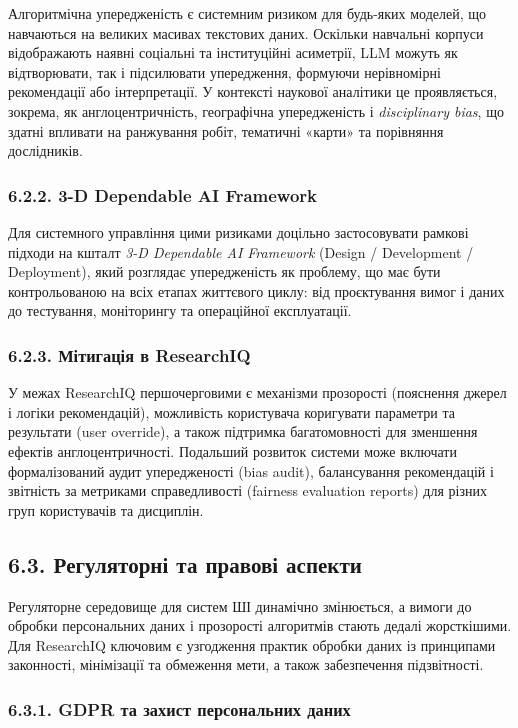 Алгоритмічна упередженість є системним ризиком для будь-яких моделей, що навчаються на великих масивах текстових даних. Оскільки навчальні корпуси відображають наявні соціальні та інституційні асиметрії, LLM можуть як відтворювати, так і підсилювати упередження, формуючи нерівномірні рекомендації або інтерпретації. У контексті наукової аналітики це проявляється, зокрема, як англоцентричність, географічна упередженість і \emph{disciplinary bias}, що здатні впливати на ранжування робіт, тематичні «карти» та порівняння дослідників.

\subsubsection*{6.2.2. 3-D Dependable AI Framework}

Для системного управління цими ризиками доцільно застосовувати рамкові підходи на кшталт \emph{3-D Dependable AI Framework} (Design / Development / Deployment), який розглядає упередженість як проблему, що має бути контрольованою на всіх етапах життєвого циклу: від проєктування вимог і даних до тестування, моніторингу та операційної експлуатації.

\subsubsection*{6.2.3. Мітигація в ResearchIQ}

У межах ResearchIQ першочерговими є механізми прозорості (пояснення джерел і логіки рекомендацій), можливість користувача коригувати параметри та результати (user override), а також підтримка багатомовності для зменшення ефектів англоцентричності. Подальший розвиток системи може включати формалізований аудит упередженості (bias audit), балансування рекомендацій і звітність за метриками справедливості (fairness evaluation reports) для різних груп користувачів та дисциплін.

\subsection*{6.3. Регуляторні та правові аспекти}

Регуляторне середовище для систем ШІ динамічно змінюється, а вимоги до обробки персональних даних і прозорості алгоритмів стають дедалі жорсткішими. Для ResearchIQ ключовим є узгодження практик обробки даних із принципами законності, мінімізації та обмеження мети, а також забезпечення підзвітності.

\subsubsection*{6.3.1. GDPR та захист персональних даних}

